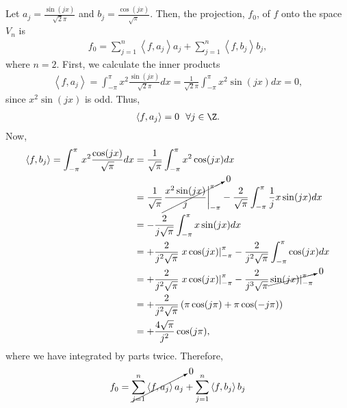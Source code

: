 \begin{questions}

\begin{solution}
Let $a_j=\frac{\sin(jx)}{\sqrt{2}\pi}$ and $b_j=\frac{\cos(jx)}{\sqrt{\pi}}$. Then, the projection, $f_0$, of $f$ onto the space $V_n$ is
\begin{align*}
f_0=\sum_{j=1}^n\left<f,a_j\right>a_j+\sum_{j=1}^n\left<f,b_j\right>b_j,
\end{align*}
where $n=2$. First, we calculate the inner products
\begin{align*}
\left<f,a_j\right>=\int_{-\pi}^{\pi}x^2\frac{\sin(jx)}{\sqrt{2}\pi}dx=\frac{1}{\sqrt{2}\pi}\int_{-\pi}^{\pi}x^2\sin(jx)dx=0,
\end{align*}
since $x^2\sin(jx)$ is odd. Thus,
\begin{align*}
\left<f,a_j\right>=0~~\forall j\in\Z.
\end{align*}
Now,
\begin{align*}
\left<f,b_j\right>=\int_{-\pi}^{\pi}x^2\frac{\cos(jx)}{\sqrt{\pi}}dx&=\frac{1}{\sqrt{\pi}}\int_{-\pi}^{\pi}x^2\cos(jx)dx\\
&=\frac{1}{\sqrt{\pi}}\cancelto{0}{\left.\frac{x^2\sin(jx)}{j}\right|_{-\pi}^{\pi}}-\frac{2}{\sqrt{\pi}}\int_{-\pi}^{\pi}\frac{1}{j} x\sin(jx)dx\\
&=-\frac{2}{j\sqrt{\pi}}\int_{-\pi}^{\pi}x\sin(jx)dx\\
&=+\frac{2}{j^2\sqrt{\pi}}\left.x\cos(jx)\right|_{-\pi}^{\pi}-\frac{2}{j^2\sqrt{\pi}}\int_{-\pi}^{\pi}\cos(jx)dx\\
&=+\frac{2}{j^2\sqrt{\pi}}\left.x\cos(jx)\right|_{-\pi}^{\pi}-\frac{2}{j^3\sqrt{\pi}}\cancelto{0}{\left.\sin(jx)\right|_{-\pi}^{\pi}}\\
&=+\frac{2}{j^2\sqrt{\pi}}\left(\pi\cos(j\pi)+\pi\cos(-j\pi)\right)\\
&=+\frac{4\sqrt{\pi}}{j^2}\cos(j\pi),
\end{align*}
where we have integrated by parts twice. Therefore,
\begin{align*}
f_0&=\cancelto{0}{\sum_{j=1}^n\left<f,a_j\right>a_j}+\sum_{j=1}^n\left<f,b_j\right>b_j\\

\end{align*}
\end{solution}
\end{questions}

